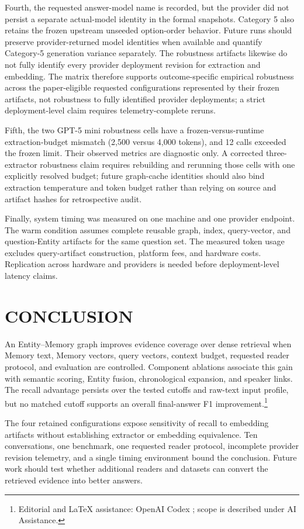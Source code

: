 \documentclass[a4paper,twoside]{article}
\newcommand{\aiedit}{\footnote{Editorial and \LaTeX{} assistance: OpenAI Codex
\cite{openai2026codex}; scope is described under AI Assistance.}}
\begin{document}
Fourth, the requested answer-model name is recorded, but the provider did not
persist a separate actual-model identity in the formal snapshots. Category 5
also retains the frozen upstream unseeded option-order behavior. Future runs
should preserve provider-returned model identities when available and quantify
Category-5 generation variance separately. The robustness artifacts likewise
do not fully identify every provider deployment revision for extraction and
embedding. The matrix therefore supports outcome-specific empirical
robustness across the paper-eligible requested configurations represented by
their frozen artifacts, not robustness to fully identified provider
deployments; a strict deployment-level claim requires telemetry-complete
reruns.

Fifth, the two GPT-5 mini robustness cells have a frozen-versus-runtime
extraction-budget mismatch (2,500 versus 4,000 tokens), and 12 calls exceeded
the frozen limit. Their observed metrics are diagnostic only. A corrected
three-extractor robustness claim requires rebuilding and rerunning those cells
with one explicitly resolved budget; future graph-cache identities should also
bind extraction temperature and token budget rather than relying on source and
artifact hashes for retrospective audit.

Finally, system timing was measured on one machine and one provider endpoint.
The warm condition assumes complete reusable graph, index, query-vector, and
question-Entity artifacts for the same question set. The measured token usage excludes query-artifact construction,
platform fees, and hardware costs. Replication across hardware and providers is needed before
deployment-level latency claims.

\section{\uppercase{Conclusion}}

An Entity--Memory graph improves evidence coverage over dense retrieval when
Memory text, Memory vectors, query vectors, context budget, requested reader
protocol, and evaluation are controlled. Component ablations associate this
gain with semantic scoring, Entity fusion, chronological expansion, and
speaker links. The recall advantage persists over the tested cutoffs and
raw-text input profile, but no matched cutoff supports an overall
final-answer F1 improvement.\aiedit{}

The four retained configurations expose sensitivity of recall to embedding
artifacts without establishing extractor or embedding equivalence.
Ten conversations, one benchmark, one requested reader protocol, incomplete
provider revision telemetry, and a single timing environment bound the
conclusion. Future work should test whether additional readers and datasets
can convert the retrieved evidence into better answers.
\end{document}
